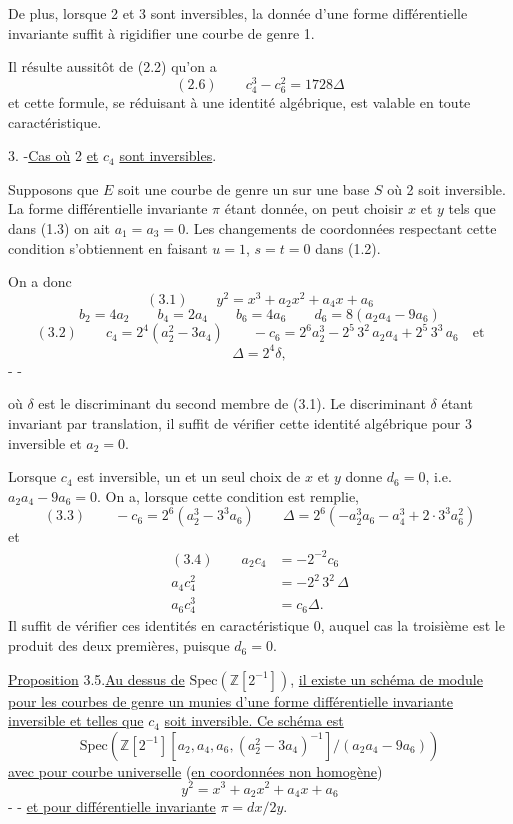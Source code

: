 De plus, lorsque 2 et 3 sont inversibles, la donnée d'une forme différentielle invariante suffit à rigidifier une courbe de genre 1.

Il résulte aussitôt de (2.2) qu'on a
\[
(2.6)\qquad c_4^3-c_6^2=1728\Delta
\]
et cette formule, se réduisant à une identité algébrique, est valable en toute caractéristique.

3. -\quad \uline{Cas où} 2 \uline{et} $c_4$ \uline{sont inversibles}.

Supposons que $E$ soit une courbe de genre un sur une base $S$ où 2 soit inversible. La forme différentielle invariante $\pi$ étant donnée, on peut choisir $x$ et $y$ tels que dans (1.3) on ait $a_1=a_3=0$. Les changements de coordonnées respectant cette condition s'obtiennent en faisant $u=1$, $s=t=0$ dans (1.2).

On a donc
\[
(3.1)\qquad y^2=x^3+a_2x^2+a_4x+a_6
\]
\[
b_2=4a_2\qquad b_4=2a_4\qquad b_6=4a_6\qquad d_6=8(a_2a_4-9a_6)
\]
\[
(3.2)\qquad c_4=2^4(a_2^2-3a_4)\qquad -c_6=2^6a_2^3-2^5\,3^2\,a_2a_4+2^5\,3^3\,a_6\quad\text{et}
\]
\[
\Delta=2^4\delta,
\]
-  -

où $\delta$ est le discriminant du second membre de (3.1). Le discriminant $\delta$ étant invariant par translation, il suffit de vérifier cette identité algébrique pour 3 inversible et $a_2=0$.

Lorsque $c_4$ est inversible, un et un seul choix de $x$ et $y$ donne $d_6=0$, i.e. $a_2a_4-9a_6=0$. On a, lorsque cette condition est remplie,
\[
(3.3)\qquad -c_6=2^6(a_2^3-3^3a_6)\qquad\Delta=2^6(-a_2^3a_6-a_4^3+2\cdot3^3a_6^2)
\]
et
\[
\begin{aligned}
(3.4)\qquad a_2c_4&=-2^{-2}c_6\\
a_4c_4^2&=-2^2\,3^2\,\Delta\\
a_6c_4^3&=c_6\Delta.
\end{aligned}
\]
Il suffit de vérifier ces identités en caractéristique 0, auquel cas la troisième est le produit des deux premières, puisque $d_6=0$.

\uline{Proposition} 3.5.\quad \uline{Au dessus de} $\mathrm{Spec}(\mathbb Z[2^{-1}])$, \uline{il existe un schéma de module pour les courbes de genre un munies d'une forme différentielle invariante inversible et telles que} $c_4$ \uline{soit inversible. Ce schéma est}
\[
\mathrm{Spec}(\mathbb Z[2^{-1}][a_2,a_4,a_6,(a_2^2-3a_4)^{-1}]/(a_2a_4-9a_6))
\]
\uline{avec pour courbe universelle} (\uline{en coordonnées non homogène}) \inserted{\unsure{$\rho$}}
\[
y^2=x^3+a_2x^2+a_4x+a_6
\]
-  -
\uline{et pour différentielle invariante} $\pi=dx/2y$.

